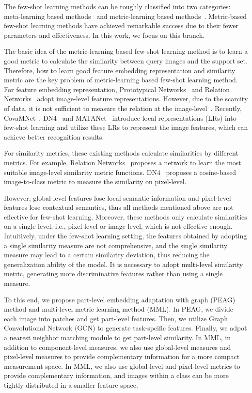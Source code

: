 \documentclass{article}
\begin{document}
The few-shot learning methods can be roughly classified into two categories: meta-learning based methods~\cite{finn2017model,sun2019meta} and metric-learning based methods~\cite{snell2017prototypical,sung2018learning,li2019revisiting,simon2020adaptive,chen2020multi}. Metric-based few-shot learning methods have achieved remarkable success due to their fewer parameters and effectiveness. In this work, we focus on this branch.

The basic idea of the metric-learning based few-shot learning method is to learn a good metric to calculate the similarity between query images and the support set. Therefore, how to learn good feature embedding representation and similarity metric are the key problem of metric-learning based few-shot learning method. For feature embedding representation, Prototypical Networks~\cite{snell2017prototypical} and Relation Networks~\cite{sung2018learning} adopt image-level feature representations. However, due to the scarcity of data, it is not sufficient to measure the relation at the image-level~\cite{snell2017prototypical,sung2018learning}. Recently, CovaMNet~\cite{li2019distribution}, DN4~\cite{li2019revisiting} and MATANet~\cite{chen2020multi} introduce local representations (LRs) into few-shot learning and utilize these LRs to represent the image features, which can achieve better recognition results. 

For similarity metrics, these existing methods calculate similarities by different metrics. For example, Relation Networks~\cite{sung2018learning} proposes a network to learn the most suitable image-level similarity metric functions. DN4~\cite{chen2020multi} proposes a cosine-based image-to-class metric to measure the similarity on pixel-level.

However, global-level features lose local semantic information and pixel-level features lose contextual semantics, thus all methods mentioned above are not effective for few-shot learning.
Moreover, these methods only calculate similarities on a single level, i.e., pixel-level or image-level, which is not effective enough. Intuitively, under the few-shot learning setting, the features obtained by adopting a single similarity measure are not comprehensive, and the single similarity measure may lead to a certain similarity deviation, thus reducing the generalization ability of the model. It is necessary to adopt multi-level similarity metric, generating more discriminative features rather than using a single measure.

To this end, we propose part-level embedding adaptation with graph (PEAG) method and multi-level metric learning method (MML).  In PEAG, we divide each image into patches and get part-level features. Then, we utilize Graph Convolutional Network (GCN) to generate task-spcific features. Finally, we adpot a nearest neighbor matching module to get part-level similarity. 
In MML, in addition to component-level measures, we also use global-level measures and pixel-level measures to provide complementary information for a more compact measurement space. In MML, we also use global-level and pixel-level metrics to provide complementary information, and images within a class can be more tightly distributed in a smaller feature space.
\end{document}
